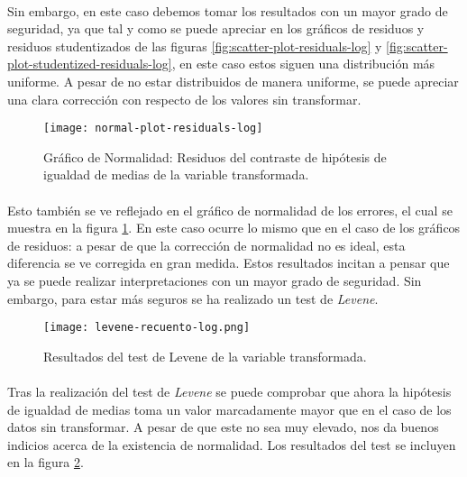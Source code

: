 \documentclass[11pt]{article}
\begin{document}
      \paragraph{}
      Sin embargo, en este caso debemos tomar los resultados con un mayor grado de seguridad, ya que tal y como se puede apreciar en los gráficos de residuos y residuos studentizados de las figuras \ref{fig:scatter-plot-residuals-log} y \ref{fig:scatter-plot-studentized-residuals-log}, en este caso estos siguen una distribución más uniforme. A pesar de no estar distribuidos de manera uniforme, se puede apreciar una clara corrección con respecto de los valores sin transformar.

      \begin{figure}[!h]
        \centering
        \texttt{[image: normal-plot-residuals-log]}
        \caption{Gráfico de Normalidad: Residuos del contraste de hipótesis de igualdad de medias de la variable transformada.}
        \label{img:normal-plot-residuals-log}
      \end{figure}

      \paragraph{}
      Esto también se ve reflejado en el gráfico de normalidad de los errores, el cual se muestra en la figura \ref{img:normal-plot-residuals-log}. En este caso ocurre lo mismo que en el caso de los gráficos de residuos: a pesar de que la corrección de normalidad no es ideal, esta diferencia se ve corregida en gran medida. Estos resultados incitan a pensar que ya se puede realizar interpretaciones con un mayor grado de seguridad. Sin embargo, para estar más seguros se ha realizado un test de \emph{Levene}.

      \begin{figure}[!h]
        \centering
        \texttt{[image: levene-recuento-log.png]}
        \caption{Resultados del test de Levene de la variable transformada.}
        \label{img:levene-test-log}
      \end{figure}

      \paragraph{}
      Tras la realización del test de \emph{Levene} se puede comprobar que ahora la hipótesis de igualdad de medias toma un valor marcadamente mayor que en el caso de los datos sin transformar. A pesar de que este no sea muy elevado, nos da buenos indicios acerca de la existencia de normalidad. Los resultados del test se incluyen en la figura \ref{img:levene-test-log}.
\end{document}
